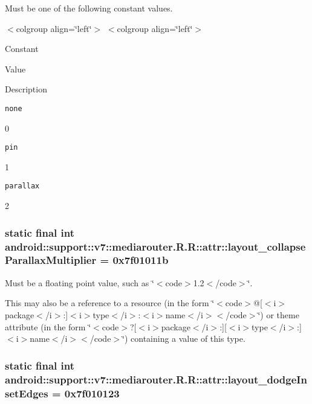 Must be one of the following constant values. \begin{TabularC}{0}
\hline
\end{TabularC}
$<$colgroup align=\char`\"{}left\char`\"{}$>$ $<$colgroup align=\char`\"{}left\char`\"{}$>$ 

Constant

Value

Description 

{\tt none}

0

{\tt pin}

1

{\tt parallax}

2\hypertarget{classandroid_1_1support_1_1v7_1_1mediarouter_1_1_r_1_1attr_91ceeb7940aff670452731b0c47d5bb6}{
\subsubsection[{layout\_\-collapseParallaxMultiplier}]{\setlength{\rightskip}{0pt plus 5cm}static final int android::support::v7::mediarouter.R.R::attr::layout\_\-collapseParallaxMultiplier = 0x7f01011b}}
\label{classandroid_1_1support_1_1v7_1_1mediarouter_1_1_r_1_1attr_91ceeb7940aff670452731b0c47d5bb6}


Must be a floating point value, such as \char`\"{}$<$code$>$1.2$<$/code$>$\char`\"{}. 

This may also be a reference to a resource (in the form \char`\"{}$<$code$>$@\mbox{[}$<$i$>$package$<$/i$>$:\mbox{]}$<$i$>$type$<$/i$>$:$<$i$>$name$<$/i$>$$<$/code$>$\char`\"{}) or theme attribute (in the form \char`\"{}$<$code$>$?\mbox{[}$<$i$>$package$<$/i$>$:\mbox{]}\mbox{[}$<$i$>$type$<$/i$>$:\mbox{]}$<$i$>$name$<$/i$>$$<$/code$>$\char`\"{}) containing a value of this type. \hypertarget{classandroid_1_1support_1_1v7_1_1mediarouter_1_1_r_1_1attr_0bb7f6857234f4bbb7e225b5f7758d37}{
\subsubsection[{layout\_\-dodgeInsetEdges}]{\setlength{\rightskip}{0pt plus 5cm}static final int android::support::v7::mediarouter.R.R::attr::layout\_\-dodgeInsetEdges = 0x7f010123}}
\label{classandroid_1_1support_1_1v7_1_1mediarouter_1_1_r_1_1attr_0bb7f6857234f4bbb7e225b5f7758d37}


